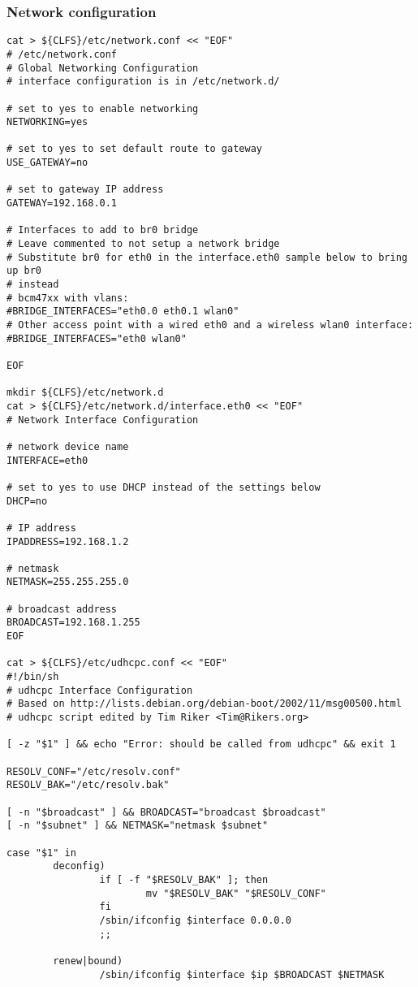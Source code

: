   \subsubsection{Network configuration}
\begin{lstlisting}
cat > ${CLFS}/etc/network.conf << "EOF"
# /etc/network.conf
# Global Networking Configuration
# interface configuration is in /etc/network.d/

# set to yes to enable networking
NETWORKING=yes

# set to yes to set default route to gateway
USE_GATEWAY=no

# set to gateway IP address
GATEWAY=192.168.0.1

# Interfaces to add to br0 bridge
# Leave commented to not setup a network bridge
# Substitute br0 for eth0 in the interface.eth0 sample below to bring up br0
# instead
# bcm47xx with vlans:
#BRIDGE_INTERFACES="eth0.0 eth0.1 wlan0"
# Other access point with a wired eth0 and a wireless wlan0 interface:
#BRIDGE_INTERFACES="eth0 wlan0"

EOF

mkdir ${CLFS}/etc/network.d
cat > ${CLFS}/etc/network.d/interface.eth0 << "EOF"
# Network Interface Configuration

# network device name
INTERFACE=eth0

# set to yes to use DHCP instead of the settings below
DHCP=no

# IP address
IPADDRESS=192.168.1.2

# netmask
NETMASK=255.255.255.0

# broadcast address
BROADCAST=192.168.1.255
EOF

cat > ${CLFS}/etc/udhcpc.conf << "EOF"
#!/bin/sh
# udhcpc Interface Configuration
# Based on http://lists.debian.org/debian-boot/2002/11/msg00500.html
# udhcpc script edited by Tim Riker <Tim@Rikers.org>

[ -z "$1" ] && echo "Error: should be called from udhcpc" && exit 1

RESOLV_CONF="/etc/resolv.conf"
RESOLV_BAK="/etc/resolv.bak"

[ -n "$broadcast" ] && BROADCAST="broadcast $broadcast"
[ -n "$subnet" ] && NETMASK="netmask $subnet"

case "$1" in
        deconfig)
                if [ -f "$RESOLV_BAK" ]; then
                        mv "$RESOLV_BAK" "$RESOLV_CONF"
                fi
                /sbin/ifconfig $interface 0.0.0.0
                ;;

        renew|bound)
                /sbin/ifconfig $interface $ip $BROADCAST $NETMASK


\end{lstlisting}
